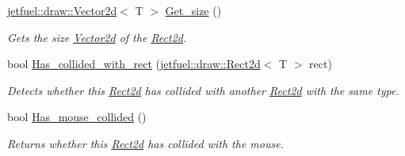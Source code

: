 \begin{DoxyCompactItemize}
\hyperlink{classjetfuel_1_1draw_1_1Vector2d}{jetfuel\+::draw\+::\+Vector2d}$<$ T $>$ \hyperlink{classjetfuel_1_1draw_1_1Rect2d_a3e14b3f59200c452a08085c724950afb}{Get\+\_\+size} ()
\begin{DoxyCompactList}\small\item\em Gets the size \hyperlink{classjetfuel_1_1draw_1_1Vector2d}{Vector2d} of the \hyperlink{classjetfuel_1_1draw_1_1Rect2d}{Rect2d}. \end{DoxyCompactList}\item 
bool \hyperlink{classjetfuel_1_1draw_1_1Rect2d_ae29d8f3e8a6f522d6aacdd00b8d3f757}{Has\+\_\+collided\+\_\+with\+\_\+rect} (\hyperlink{classjetfuel_1_1draw_1_1Rect2d}{jetfuel\+::draw\+::\+Rect2d}$<$ T $>$ rect)
\begin{DoxyCompactList}\small\item\em Detects whether this \hyperlink{classjetfuel_1_1draw_1_1Rect2d}{Rect2d} has collided with another \hyperlink{classjetfuel_1_1draw_1_1Rect2d}{Rect2d} with the same type. \end{DoxyCompactList}\item 
bool \hyperlink{classjetfuel_1_1draw_1_1Rect2d_affa3a06a40154e71485b9676710f6d0d}{Has\+\_\+mouse\+\_\+collided} ()
\begin{DoxyCompactList}\small\item\em Returns whether this \hyperlink{classjetfuel_1_1draw_1_1Rect2d}{Rect2d} has collided with the mouse. \end{DoxyCompactList}\end{DoxyCompactItemize}
